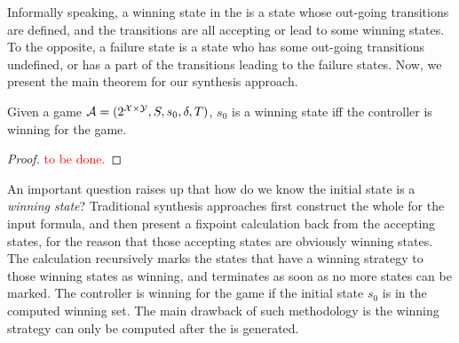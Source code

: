 Informally speaking, a winning state in the \tdfa is a state whose out-going transitions are defined, and the transitions are all accepting or lead to some winning states. To the opposite, a failure state is a state who has some out-going transitions undefined, or has a part of the transitions leading to the failure states. Now, we present the main theorem for our synthesis approach. 

\begin{theorem}\label{thm:winning-and-failure}
Given a \tdfa game $\mathcal{A} =(2^{\mathcal{X}\times \mathcal{Y}},S,s_0,\delta,T)$, $s_0$ is a winning state iff the controller is winning for the game.
\end{theorem}
\begin{proof}
\textcolor{red}{to be done.}
\end{proof}

An important question raises up that how do we know the initial state is a \emph{winning state}? Traditional synthesis approaches \cite{GV15} first construct the whole \dfa for the input formula, and then present a fixpoint calculation back from the accepting states, for the reason that those accepting states are obviously winning states. The calculation recursively marks the states that have a winning strategy to those winning states as winning, and terminates as soon as no more states can be marked. The controller is winning for the game if the initial state $s_0$ is in the computed winning set. The main drawback of such methodology is the winning strategy can only be computed after the \dfa is generated.  


